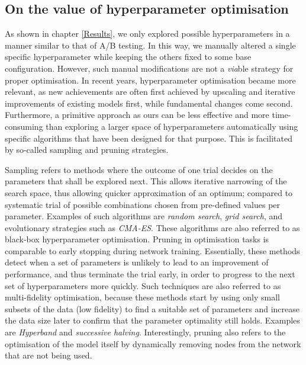 \subsection{On the value of hyperparameter optimisation}

As shown in chapter \ref{Results}, we only explored possible hyperparameters in a manner similar to that of A/B testing. In this way, we manually altered a single specific hyperparameter while keeping the others fixed to some base configuration. However, such manual modifications are not a \textit{via}ble strategy for proper optimisation. In recent years, hyperparameter optimisation became more relevant, as new achievements are often first achieved by upscaling and iterative improvements of existing models first, while fundamental changes come second. \cite{Yu2020Hyper}
Furthermore, a primitive approach as ours can be less effective and more time-consuming than exploring a larger space of hyperparameters automatically using specific algorithms that have been designed for that purpose. This is facilitated by so-called sampling and pruning strategies. 

Sampling refers to methods where the outcome of one trial decides on the parameters that shall be explored next. This allows iterative narrowing of the search space, thus allowing quicker approximation of an optimum; compared to systematic trial of possible combinations chosen from pre-defined values per parameter. \cite{Akiba2019Optuna} Examples of such algorithms are \textit{random search}, \textit{grid search}, and evolutionary strategies such as \textit{CMA-ES}. \cite{Hansen2016CMA, Feurer2019Hyperparameter} These algorithms are also referred to as black-box hyperparameter optimisation. \cite{Feurer2019Hyperparameter}
Pruning in optimisation tasks is comparable to early stopping during network training. Essentially, these methods detect when a set of parameters is unlikely to lead to an improvement of performance, and thus terminate the trial early, in order to progress to the next set of hyperparameters more quickly. \cite{Akiba2019Optuna} Such techniques are also referred to as multi-fidelity optimisation, because these methods start by using only small subsets of the data (low fidelity) to find a suitable set of parameters and increase the data size later to confirm that the parameter optimality still holds. Examples are \textit{Hyperband} and \textit{successive halving}. \cite{Feurer2019Hyperparameter}
Interestingly, pruning also refers to the optimisation of the model itself by dynamically removing nodes from the network that are not being used. \cite{Liao2022Empirical} 

